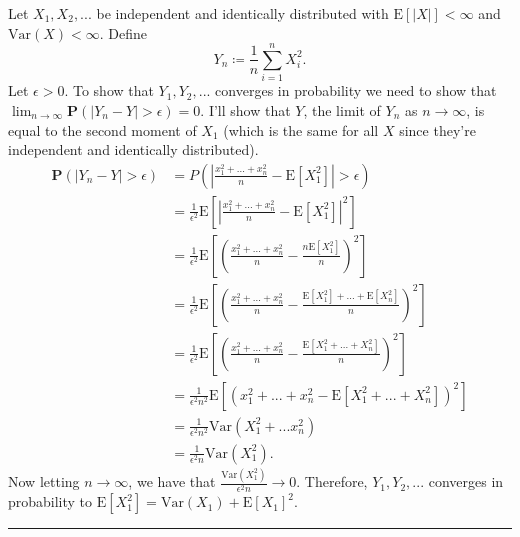 \documentclass{article}
\theoremstyle{break}
\renewenvironment{proof}{{\bf Proof:}}{\hfill\rule{2mm}{2mm}}
\newcommand{\E}{\mathrm{E}}
\newcommand{\var}{\mathrm{Var}}
\renewcommand{\P}{\mathbf{P}}
\begin{document}
\begin{proof}
  Let $X_1, X_2, ...$ be independent and identically distributed with $\E[|X|] < \infty$ and $\var(X) < \infty$. Define
  \[
    Y_n \coloneqq \frac{1}{n} \sum_{i=1}^n X_i^2.
  \]
  Let $\epsilon > 0$. To show that $Y_1, Y_2, ...$ converges in probability we need to show that $\lim_{n \rightarrow \infty} \P(|Y_n - Y| > \epsilon) = 0$. I'll show that $Y$, the limit of $Y_n$ as $n \rightarrow \infty$, is equal to the second moment of $X_1$ (which is the same for all $X$ since they're independent and identically distributed).
  \begin{align*}
    \P(|Y_n - Y| > \epsilon) &= P\left( \left| \frac{x_1^2 + ... + x_n^2}{n} - \E[X_1^2] \right| > \epsilon \right) \\
    &= \frac{1}{\epsilon^2} \E\left[ \left| \frac{x_1^2 + ... + x_n^2}{n} - \E[X_1^2] \right|^2 \right] \\
    &= \frac{1}{\epsilon^2} \E\left[ \left( \frac{x_1^2 + ... + x_n^2}{n} - \frac{n\E[X_1^2]}{n} \right)^2 \right] \\
    &= \frac{1}{\epsilon^2} \E\left[ \left( \frac{x_1^2 + ... + x_n^2}{n} - \frac{\E[X_1^2] + ... + \E[X_n^2]}{n} \right)^2 \right] \\
    &= \frac{1}{\epsilon^2} \E\left[ \left( \frac{x_1^2 + ... + x_n^2}{n} - \frac{\E[X_1^2 + ... + X_n^2]}{n} \right)^2 \right] \\
    &= \frac{1}{\epsilon^2 n^2} \E\left[ \left( x_1^2 + ... + x_n^2 - \E[X_1^2 + ... + X_n^2] \right)^2 \right] \\
    &= \frac{1}{\epsilon^2 n^2} \var(X_1^2 + ... x_n^2) \\
    &= \frac{1}{\epsilon^2 n} \var(X_1^2).
  \end{align*}
  Now letting $n \rightarrow \infty$, we have that $\frac{\var(X_1^2)}{\epsilon^2 n} \rightarrow 0$. Therefore, $Y_1, Y_2, ...$ converges in probability to $\E[X_1^2] = \var(X_1) + \E[X_1]^2$.
\end{proof}
\end{document}
